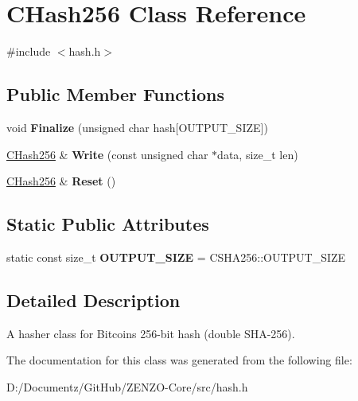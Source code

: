 \hypertarget{class_c_hash256}{}\section{C\+Hash256 Class Reference}
\label{class_c_hash256}


{\ttfamily \#include $<$hash.\+h$>$}

\subsection*{Public Member Functions}
\begin{DoxyCompactItemize}
\item 
\mbox{\label{class_c_hash256_aa8a70c1b7cf24ce7d00240a1131cf4e7}} 
void {\bfseries Finalize} (unsigned char hash\mbox{[}O\+U\+T\+P\+U\+T\+\_\+\+S\+I\+ZE\mbox{]})
\item 
\mbox{\label{class_c_hash256_a9cc25033c6435cb28e2e8e377c949a7a}} 
\mbox{\hyperlink{class_c_hash256}{C\+Hash256}} \& {\bfseries Write} (const unsigned char $\ast$data, size\+\_\+t len)
\item 
\mbox{\label{class_c_hash256_ab25b00e4cda7e209173f2ce90475953d}} 
\mbox{\hyperlink{class_c_hash256}{C\+Hash256}} \& {\bfseries Reset} ()
\end{DoxyCompactItemize}
\subsection*{Static Public Attributes}
\begin{DoxyCompactItemize}
\item 
\mbox{\label{class_c_hash256_a6812a40441acb1c3b7f10c7e38c7d467}} 
static const size\+\_\+t {\bfseries O\+U\+T\+P\+U\+T\+\_\+\+S\+I\+ZE} = C\+S\+H\+A256\+::\+O\+U\+T\+P\+U\+T\+\_\+\+S\+I\+ZE
\end{DoxyCompactItemize}


\subsection{Detailed Description}
A hasher class for Bitcoin\textquotesingle{}s 256-\/bit hash (double S\+H\+A-\/256). 

The documentation for this class was generated from the following file\+:\begin{DoxyCompactItemize}
\item 
D\+:/\+Documentz/\+Git\+Hub/\+Z\+E\+N\+Z\+O-\/\+Core/src/hash.\+h\end{DoxyCompactItemize}
